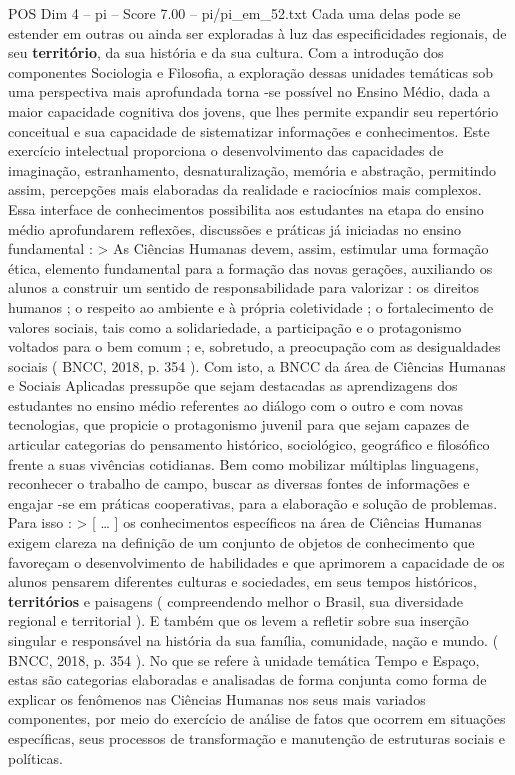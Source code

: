\begin{textsample}{POS Dim 4 – pi – Score 7.00 – pi/pi\_em\_52.txt}
Cada uma delas pode se estender em outras ou ainda ser exploradas à luz das especificidades regionais, de seu \textbf{território}, da sua história e da sua cultura.
Com a introdução dos componentes Sociologia e Filosofia, a exploração dessas unidades temáticas sob uma perspectiva mais aprofundada torna -se possível no Ensino Médio, dada a maior capacidade cognitiva dos jovens, que lhes permite expandir seu repertório conceitual e sua capacidade de sistematizar informações e conhecimentos.
Este exercício intelectual proporciona o desenvolvimento das capacidades de imaginação, estranhamento, desnaturalização, memória e abstração, permitindo assim, percepções mais elaboradas da realidade e raciocínios mais complexos.
Essa interface de conhecimentos possibilita aos estudantes na etapa do ensino médio aprofundarem reflexões, discussões e práticas já iniciadas no ensino fundamental : > As Ciências Humanas devem, assim, estimular uma formação ética, elemento fundamental para a formação das novas gerações, auxiliando os alunos a construir um sentido de responsabilidade para valorizar : os direitos humanos ; o respeito ao ambiente e à própria coletividade ; o fortalecimento de valores sociais, tais como a solidariedade, a participação e o protagonismo voltados para o bem comum ; e, sobretudo, a preocupação com as desigualdades sociais ( BNCC, 2018, p. 354 ).
Com isto, a BNCC da área de Ciências Humanas e Sociais Aplicadas pressupõe que sejam destacadas as aprendizagens dos estudantes no ensino médio referentes ao diálogo com o outro e com novas tecnologias, que propicie o protagonismo juvenil para que sejam capazes de articular categorias do pensamento histórico, sociológico, geográfico e filosófico frente a suas vivências cotidianas.
Bem como mobilizar múltiplas linguagens, reconhecer o trabalho de campo, buscar as diversas fontes de informações e engajar -se em práticas cooperativas, para a elaboração e solução de problemas.
Para isso : > [ … ] os conhecimentos específicos na área de Ciências Humanas exigem clareza na definição de um conjunto de objetos de conhecimento que favoreçam o desenvolvimento de habilidades e que aprimorem a capacidade de os alunos pensarem diferentes culturas e sociedades, em seus tempos históricos, \textbf{territórios} e paisagens ( compreendendo melhor o Brasil, sua diversidade regional e territorial ).
E também que os levem a refletir sobre sua inserção singular e responsável na história da sua família, comunidade, nação e mundo. ( BNCC, 2018, p. 354 ).
No que se refere à unidade temática Tempo e Espaço, estas são categorias elaboradas e analisadas de forma conjunta como forma de explicar os fenômenos nas Ciências Humanas nos seus mais variados componentes, por meio do exercício de análise de fatos que ocorrem em situações específicas, seus processos de transformação e manutenção de estruturas sociais e políticas.

\end{textsample}
